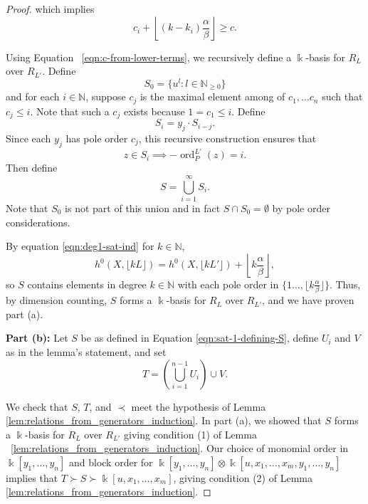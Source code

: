 \documentclass{amsart}
\theoremstyle{plain}
\theoremstyle{definition}
\theoremstyle{remark}
\numberwithin{equation}{section}
\newcommand\BN{{\mathbb N}}
\newcommand\Bk{{\Bbbk}}
\DeclareMathOperator{\ord}{ord}
\newcommand{\halfcan}{L}
\begin{document}
\begin{proof}
\noindent
which implies
\begin{equation}\label{eqn:c-from-lower-terms}
	c_i +\left\lfloor (k-k_i) \frac{\alpha}{\beta} \right\rfloor \ge c.
\end{equation}

Using Equation ~\ref{eqn:c-from-lower-terms}, we recursively define a $\Bk$-basis for $R_\halfcan$ over $R_{\halfcan'}$. Define 
\[
	S_0 = \{u^l : l \in \BN_{\ge 0}\}
\]
and for each $i \in \BN$, suppose $c_j$ is the maximal element among of $c_1, \ldots c_n$ such that $c_j \le i.$ Note that such a $c_j$ exists because $1=c_1\le i.$ Define
\[
	S_i = y_j \cdot S_{i-j}.
\]
Since each $y_j$ has pole order $c_j$, this recursive construction ensures that 
\[
	z\in S_i \implies -\ord_P^{\halfcan'}(z)=i.
\]
Then define 
\begin{equation}\label{eqn:sat-1-defining-S}
	S = \bigcup_{i=1}^{\infty} S_i.  
\end{equation}
Note that $S_0$ is not part of this union and in fact $S\cap S_0 = \emptyset$ by pole order considerations.

By equation \ref{eqn:deg1-sat-ind} for $k \in \BN$,
\[
	h^0(X, \lfloor k \halfcan \rfloor) = h^0(X, \lfloor k \halfcan'
		\rfloor) + \left\lfloor k \frac{\alpha} {\beta} \right \rfloor,
\] 
so $S$ contains elements in degree $k \in \BN$ with each pole order in $\{1 \ldots, \lfloor k\frac{\alpha}{\beta}\rfloor\}$.  Thus, by dimension counting, $S$ forms a $\Bk$-basis for $R_\halfcan$ over $R_{\halfcan'}$, and we have proven part (a).

{\bf Part (b):}
Let $S$ be as defined in Equation \ref{eqn:sat-1-defining-S}, define $U_i$ and $V$ as in the lemma's statement, and set
\[
	T = \left(\bigcup_{i=1}^{n-1} U_i \right) \cup V.
\]

We check that $S$, $T$, and $\prec$ meet the hypothesis of Lemma \ref{lem:relations_from_generators_induction}.  In part (a), we showed that $S$ forms a $\Bk$-basis for $R_\halfcan$ over $R_{\halfcan'}$ giving condition (1) of Lemma ~\ref{lem:relations_from_generators_induction}.  Our choice of monomial order in $\Bk[y_1, \ldots, y_n]$ and block order for $\Bk[y_1, \ldots, y_n]\otimes \Bk[u, x_1, \ldots, x_m, y_1, \ldots, y_n]$ implies that $T\succ S\succ \Bk[u, x_1, \ldots, x_m]$, giving condition (2) of Lemma \ref{lem:relations_from_generators_induction}.  


\end{proof}
\end{document}
